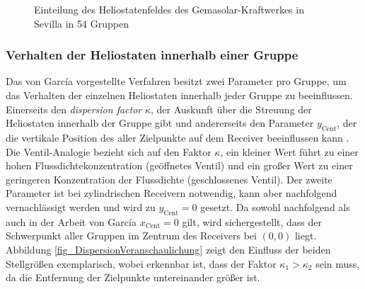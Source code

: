 \begin{figure}[h!]
    \centering
    \setlength{\fboxsep}{1pt}
    \setlength{\fboxrule}{1pt}
    \caption[Einteilung des Heliostatenfeldes des Gemasolar-Kraftwerkes in Sevilla in 54 Gruppen]{Einteilung des Heliostatenfeldes des Gemasolar-Kraftwerkes in Sevilla in 54 Gruppen \cite[S.10]{Garcia2}}
    \label{fig_VerteilungHeliostateGarcia}
\end{figure}

\subsubsection*{Verhalten der Heliostaten innerhalb einer Gruppe} \label{subsubsec_Gruppenverhalten}
Das von García vorgestellte Verfahren besitzt zwei Parameter pro Gruppe, um das Verhalten der einzelnen Heliostaten innerhalb jeder Gruppe zu beeinflussen.
Einerseits den \textit{dispersion factor} $\kappa$, der Auskunft über die Streuung der Heliostaten innerhalb der Gruppe gibt und andererseits den Parameter $y_{\mathrm{Cent}}$, der die vertikale Position des  aller Zielpunkte auf dem Receiver beeinflussen kann \cite[S.5]{Garcia2}.
Die Ventil-Analogie bezieht sich auf den Faktor $\kappa$, ein kleiner Wert führt zu einer hohen Flussdichtekonzentration (geöffnetes Ventil) und ein großer Wert zu einer geringeren Konzentration der Flussdichte (geschlossenes Ventil).
Der zweite Parameter ist bei zylindrischen Receivern notwendig, kann aber nachfolgend vernachlässigt werden und wird zu $y_{\mathrm{Cent}} = 0$ gesetzt.
Da sowohl nachfolgend als auch in der Arbeit von García $x_{\mathrm{Cent}} = 0$ gilt, wird sichergestellt, dass der Schwerpunkt aller Gruppen im Zentrum des Receivers bei $(0,0)$ liegt.
Abbildung \ref{fig_DispersionVeranschaulichung} zeigt den Einfluss der beiden Stellgrößen exemplarisch, wobei erkennbar ist, dass der Faktor $\kappa_1 > \kappa_2$ sein muss, da die Entfernung der Zielpunkte untereinander größer ist.

